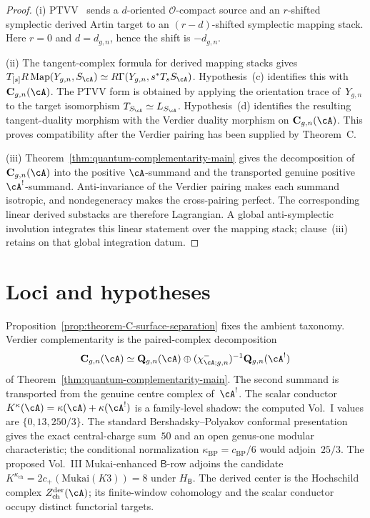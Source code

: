 \begin{proof}
\textup{(i)} PTVV~\cite[Theorem~2.5]{PTVV13} sends a
\(d\)-oriented \(\mathcal O\)-compact source and an \(r\)-shifted
symplectic derived Artin target to an \((r-d)\)-shifted symplectic
mapping stack. Here \(r=0\) and \(d=d_{g,n}\), hence the shift is
\(-d_{g,n}\).

\textup{(ii)} The tangent-complex formula for derived mapping stacks
\textup{\cite[3.3.3]{HAG-II}} gives
$T_{[s]}R\operatorname{Map}(Y_{g,n},S_\cA)\simeq
R\Gamma(Y_{g,n},s^*T_sS_\cA)$. Hypothesis~\textup{(c)} identifies this
with $\mathbf{C}_{g,n}(\cA)$. The PTVV form is obtained by applying the
orientation trace of~$Y_{g,n}$ to the target isomorphism
$T_{S_\cA}\simeq L_{S_\cA}$. Hypothesis~\textup{(d)} identifies the
resulting tangent-duality morphism with the Verdier duality morphism
on $\mathbf{C}_{g,n}(\cA)$. This proves compatibility after the Verdier
pairing has been supplied by Theorem~C.

\textup{(iii)} Theorem~\ref{thm:quantum-complementarity-main} gives
the decomposition of \(\mathbf C_{g,n}(\cA)\) into the positive
\(\cA\)-summand and the transported genuine positive
\(\cA^!\)-summand.  Anti-invariance of the Verdier pairing makes each
summand isotropic, and nondegeneracy makes the cross-pairing perfect.
The corresponding linear derived substacks are therefore
Lagrangian.  A global anti-symplectic involution integrates this
linear statement over the mapping stack; clause~\textup{(iii)} retains
\ClaimStatusConditional{} on that global integration datum.
\end{proof}

\section{Loci and hypotheses}
\label{sec:theorem-C-refinements-summary}

Proposition~\ref{prop:theorem-C-surface-separation} fixes the
ambient taxonomy. Verdier complementarity is the paired-complex
decomposition
\[
 \mathbf C_{g,n}(\cA)\simeq
 \mathbf Q_{g,n}(\cA)\oplus
 (\chi^-_{\cA;g,n})^{-1}\mathbf Q_{g,n}(\cA^!)
\]
of Theorem~\ref{thm:quantum-complementarity-main}.  The second
summand is transported from the genuine centre complex of~\(\cA^!\).
The scalar conductor
$K^\kappa(\cA)=\kappa(\cA)+\kappa(\cA^!)$ is a family-level shadow:
the computed Vol.~I values are $\{0,13,250/3\}$.  The standard
Bershadsky--Polyakov conformal presentation gives the exact
central-charge sum~$50$ and an open genus-one modular characteristic;
the conditional normalization $\kappa_{\mathrm{BP}}=c_{\mathrm{BP}}/6$
would adjoin~$25/3$.
The proposed Vol.~III Mukai-enhanced $\mathsf B$-row adjoins the
\ClaimStatusConjectured{} candidate
$K^{\kappa_{\mathrm{ch}}}=2c_+(\mathrm{Mukai}(K3))=8$ under
$H_{\mathsf B}$. The
derived center is the Hochschild complex
$Z^{\mathrm{der}}_{\mathrm{ch}}(\cA)$; its finite-window cohomology
and the scalar conductor occupy distinct functorial targets.

